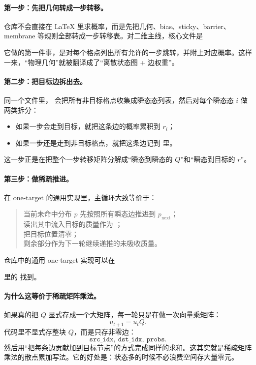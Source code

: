\documentclass[11pt,fontset=fandol]{ctexart}
\begin{document}
\paragraph{第一步：先把几何转成一步转移。}
仓库不会直接在 LaTeX 里求概率，而是先把几何、bias、sticky、barrier、membrane 等规则全部转成一步转移表。对二维主线，核心文件是
\begin{quote}
\end{quote}
它做的第一件事，是对每个格点列出所有允许的一步跳转，并附上对应概率。这样一来，“物理几何”就被翻译成了“离散状态图 + 边权重”。

\paragraph{第二步：把目标边拆出去。}
同一个文件里， 会把所有非目标格点收集成瞬态态列表，然后对每个瞬态态 $i$ 做两类拆分：
\begin{itemize}
  \item 如果一步会走到目标，就把这条边的概率累积到 $r_i$；
  \item 如果一步还是走到非目标格点，就把这条边记到  里。
\end{itemize}
这一步正是在把整个一步转移矩阵分解成“瞬态到瞬态的 $Q$”和“瞬态到目标的 $r$”。

\paragraph{第三步：做稀疏推进。}
在 one-target 的通用实现里，主循环大致等价于：
\begin{quote}
当前未命中分布 $p$ 先按照所有瞬态边推进到 $p_{\text{next}}$；\\
读出其中流入目标的质量作为 ；\\
把目标位置清零；\\
剩余部分作为下一轮继续递推的未吸收质量。
\end{quote}
仓库中的通用 one-target 实现可以在
\begin{quote}
\end{quote}
里的  找到。

\paragraph{为什么这等价于稀疏矩阵乘法。}
如果真的把 $Q$ 显式存成一个大矩阵，每一轮只是在做一次向量乘矩阵：
\[
  u_{t+1}=u_tQ.
\]
代码里不显式存整块 $Q$，而是只存非零边：
\[
  \texttt{src\_idx},\ \texttt{dst\_idx},\ \texttt{probs}.
\]
然后用“把每条边贡献加到目标节点”的方式完成同样的求和。这其实就是稀疏矩阵乘法的散点累加写法。它的好处是：状态多的时候不必浪费空间存大量零元。
\end{document}
